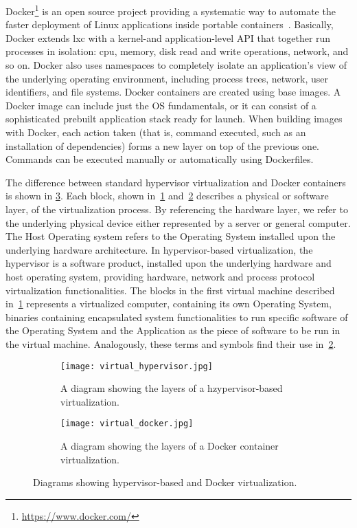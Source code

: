 \documentclass[
a4paper,
twoside,
headsepline,
cleardoublepage=empty,
parskip=half,
draft=false
]{scrbook}
\begin{document}
			Docker\footnote{\url{https://www.docker.com/}} is an open source project providing a systematic way to automate the faster deployment of Linux applications inside portable containers~\cite{bernstein2014containers}. 
			Basically, Docker extends \gls{lxc} with a kernel-and application-level API that together run processes in isolation: \gls{cpu}, memory, disk read and write operations, network, and so on. 
			Docker also uses namespaces to completely isolate an application’s view of the underlying operating environment, including process trees, network, user identifiers, and file systems.
			Docker containers are created using base images.
			A Docker image can include just the OS fundamentals, or it can consist of a sophisticated prebuilt application stack ready for launch. 
			When building images with Docker, each action taken (that is, command executed, such as an installation of dependencies) forms a new layer on top of the previous one. 
			Commands can be executed manually or automatically using Dockerfiles.
			
			The difference between standard hypervisor virtualization and Docker containers is shown in \cref{fig:virtualization}.
			Each block, shown in~\cref{subfig:hypervisor} and~\cref{subfig:docker} describes a physical or software layer, of the virtualization process. 
			By referencing the hardware layer, we refer to the underlying physical device either represented by a server or general computer. 
			The Host Operating system refers to the Operating System installed upon the underlying hardware architecture.
			In hypervisor-based virtualization, the hypervisor is a software product, installed upon the underlying hardware and host operating system, providing hardware, network and process protocol virtualization functionalities.
			The blocks in the first virtual machine described in~\cref{subfig:hypervisor} represents a virtualized computer, containing its own Operating System, binaries containing encapsulated system functionalities to run specific software of the Operating System and the Application as the piece of software to be run in the virtual machine.
			Analogously, these terms and symbols find their use in~\cref{subfig:docker}.
			
			\begin{figure}[htbp]
				\centering
				\begin{subfigure}{0.45\textwidth}
					\centering
					\texttt{[image: virtual\_hypervisor.jpg]}
					\caption{A diagram showing the layers of a hzypervisor-based virtualization.}
					\label{subfig:hypervisor}
				\end{subfigure}
				\hfill
				\begin{subfigure}{0.45\textwidth}
					\centering
					\texttt{[image: virtual\_docker.jpg]}
					\caption{A diagram showing the layers of a Docker container virtualization.}
					\label{subfig:docker}
				\end{subfigure}
				\caption{Diagrams showing hypervisor-based and Docker virtualization.}
				\label{fig:virtualization}
			\end{figure}
			
\end{document}
